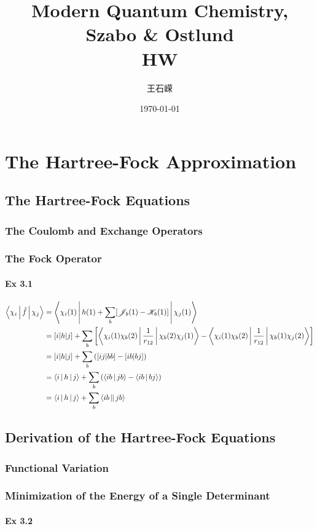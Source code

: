 \documentclass[a4paper]{article}
\title{\textbf{Modern Quantum Chemistry, Szabo \& Ostlund}\\HW}
\author{王石嵘
\vspace{5pt}\\
}
\date{\today} %
\newcommand{\ex}[1]{\paragraph{Ex #1}}
\numberwithin{equation}{subsection}
\begin{document}

\maketitle

\tableofcontents

\newpage

\setcounter{section}{2}
\section{The Hartree-Fock Approximation}
\subsection{The Hartree-Fock Equations}
\subsubsection{The Coulomb and Exchange Operators}
\subsubsection{The Fock Operator}
\ex{3.1}
\begin{align}
\Braket{\chi_i | \hat{f} | \chi_j} &= \Braket{ \chi_i(1) | h(1) + \sum_{b} [\mathscr{J}_b(1) - \mathscr{K}_b(1)] | \chi_j(1)} \notag\\
&= [i|h|j] + \sum_b\qty[\Braket{\chi_i(1) \chi_b(2) | \dfrac{1}{r_{12}} | \chi_b(2)\chi_j(1)} - \Braket{\chi_i(1)\chi_b(2) | \dfrac{1}{r_{12}} | \chi_b(1)\chi_j(2)}] \notag\\
&= [i|h|j] + \sum_b\qty([ij|bb] - [ib|bj]) \notag\\
&= \Braket{i|h|j} + \sum_b\qty(\Braket{ib|jb} - \Braket{ib|bj}) \notag\\
&= \Braket{i|h|j} + \sum_b\Braket{ib||jb}
\end{align}

\subsection{Derivation of the Hartree-Fock Equations}
\subsubsection{Functional Variation}
\subsubsection{Minimization of the Energy of a Single Determinant}
\ex{3.2}
\end{document}
